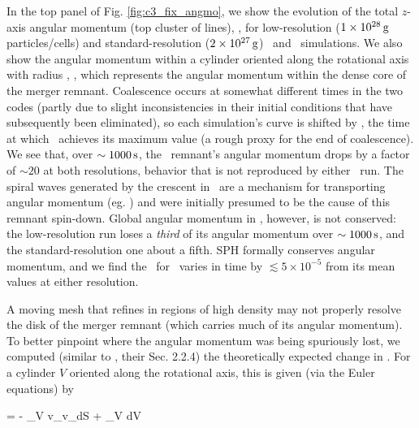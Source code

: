 In the top panel of Fig. \ref{fig:c3_fix_angmo}, we show the evolution of the total $z$-axis angular momentum (top cluster of lines), \Lztot, for low-resolution ($1\times10^{28}\,\mathrm{g}$ particles/cells) and standard-resolution ($2\times10^{27}\,\mathrm{g}$) \gasoline\ and \arepo\ simulations.  We also show the angular momentum within a cylinder oriented along the rotational axis with radius \innercyl, \Lzinner, which represents the angular momentum within the dense core of the merger remnant.  Coalescence occurs at somewhat different times in the two codes (partly due to slight inconsistencies in their initial conditions that have subsequently been eliminated), so each simulation's curve is shifted by \tlm, the time at which \Lzinner\ achieves its maximum value (a rough proxy for the end of coalescence).  We see that, over $\sim1000\,\mathrm{s}$, the \arepo\ remnant's angular momentum drops by a factor of $\sim20$ at both resolutions, behavior that is not reproduced by either \gasoline\ run.  The spiral waves generated by the crescent in \arepo\ are a mechanism for transporting angular momentum (eg. \citealt{balb03}) and were initially presumed to be the cause of this remnant spin-down.  Global angular momentum in \arepo, however, is not conserved: the low-resolution run loses a \textit{third} of its angular momentum over $\sim1000\,\mathrm{s}$, and the standard-resolution one about a fifth.  SPH formally conserves angular momentum, and we find the \Lztot\ for \gasoline\ varies in time by $\lesssim5\times10^{-5}$ from its mean values at either resolution.


A moving mesh that refines in regions of high density may not properly resolve the disk of the merger remnant (which carries much of its angular momentum).  To better pinpoint where the angular momentum was being spuriously lost, we computed (similar to \cite{ji+13}, their Sec. 2.2.4) the theoretically expected change in \Lz.  For a cylinder $V$ oriented along the rotational axis, this is given (via the Euler equations) by

\eqbegin
{} = - \oint_V \rho \varpi v_\phi v_\varpi dS + \int_V {\boldmath \varpi}\times{\bf \nabla}\Phi dV
\label{eq:c3_angmobalance}
\eqend

